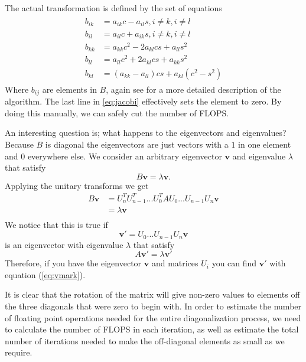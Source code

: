 \documentclass[reprint,english,notitlepage,nofootinbib]{revtex4-1}  %
\begin{document}
The actual transformation is defined by the set of equations
\begin{align}
\begin{split}
	b_{ik} &= a_{ik}c - a_{il}s, i \neq k, i \neq l \\
	b_{il} &= a_{il}c + a_{ik}s, i \neq k, i \neq l \\
	b_{kk} &= a_{kk}c^2 - 2a_{kl}cs + a_{ll}s^2 \\
	b_{ll} &= a_{ll}c^2 + 2a_{kl}cs + a_{kk}s^2 \\
	b_{kl} &= (a_{kk} - a_{ll} )cs + a_{kl}(c^2 - s^2)
	\label{eq:jacobi}
\end{split}
\end{align}
Where $b_{ij}$ are elements in $B$, again see \citep{lecnotes} for a more detailed description of the algorithm. The last line in \ref{eq:jacobi} effectively sets the element to zero. By doing this manually, we can safely cut the number of FLOPS.

An interesting question is; what happens to the eigenvectors and eigenvalues? Because $B$ is diagonal the eigenvectors are just vectors with a $1$ in one element and $0$ everywhere else. We consider an arbitrary eigenvector $\mathbf{v}$ and eigenvalue $\lambda$ that satisfy
\begin{equation*}
	B\mathbf{v} = \lambda \mathbf{v} .
\end{equation*}
Applying the unitary transforms we get
\begin{align*}
	B\mathbf{v} &= U_n^T U_{n-1}^T ... U_0^T A U_0 ... U_{n-1}U_n \mathbf{v} \\
	&= \lambda \mathbf{v} \\
 \end{align*}
We notice that this is true if
\begin{equation}
	\mathbf{v'} = U_0 ... U_{n-1}U_n \mathbf{v}
	\label{eq:vmark}
\end{equation}
is an eigenvector with eigenvalue $\lambda$ that satisfy
\begin{equation*}
	A \mathbf{v}' = \lambda \mathbf{v}'
\end{equation*}
Therefore, if you have the eigenvector $\mathbf{v}$ and matrices $U_i$ you can find $\mathbf{v}'$ with equation (\ref{eq:vmark}).

It is clear that the rotation of the matrix will give non-zero values to elements off the three diagonals that were zero to begin with. In order to estimate the number of floating point operations needed for the entire diagonalization process, we need to calculate the number of FLOPS in each iteration, as well as estimate the total number of iterations needed to make the off-diagonal elements as small as we require.
\end{document}
